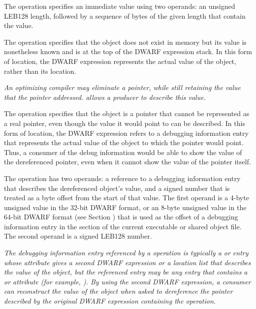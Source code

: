 \begin{enumerate}[1. ]
\itembfnl{\DWOPimplicitvalueTARG}
The \DWOPimplicitvalueNAME{} operation specifies an immediate value
using two operands: an unsigned LEB128
length, followed by a
sequence of bytes of the given length that contain the value.

\itembfnl{\DWOPstackvalueTARG}
The \DWOPstackvalueNAME{} operation specifies that the object does not
exist in memory but its value is nonetheless known and is at the top
of the DWARF expression stack. In this form of location, the DWARF
expression represents the actual value of the object, rather than its
location.

\itembfnl{\DWOPimplicitpointerTARG}
\textit{An optimizing compiler may eliminate a pointer, while
still retaining the value that the pointer addressed.
\DWOPimplicitpointerNAME{} allows a producer to describe this value.}

The \DWOPimplicitpointerNAME{} operation specifies that the object is
a pointer that cannot be represented as a real pointer, even though
the value it would point to can be described. In this form of
location, the DWARF expression refers to a debugging information entry
that represents the actual value of the object to which the pointer
would point. Thus, a consumer of the debug information would be able
to show the value of the dereferenced pointer, even when it cannot
show the value of the pointer itself.

The \DWOPimplicitpointerNAME{} operation has two operands: a
reference to a debugging information entry that describes
the dereferenced object's value, and a signed number that
is treated as a byte offset from the start of that value.
The first operand is a 4-byte unsigned value in the 32-bit
DWARF format, or an 8-byte unsigned value in the 64-bit
DWARF format (see Section
)
\bb
that is used as the offset of a debugging information entry
in the \dotdebuginfo{} section of the current executable
or shared object file.
\eb
The second operand is a
signed LEB128 number.
\db

\textit{The debugging information entry referenced by a
\DWOPimplicitpointerNAME{} operation is typically a
\DWTAGvariable{} or \DWTAGformalparameter{} entry whose
\DWATlocation{} attribute gives a second DWARF expression or a
location list that describes the value of the object, but the
referenced entry may be any entry that contains a \DWATlocation{}
or \DWATconstvalue{} attribute (for example, \DWTAGdwarfprocedure).
By using the second DWARF expression, a consumer can
reconstruct the value of the object when asked to dereference
the pointer described by the original DWARF expression
containing the \DWOPimplicitpointer{} operation.}


\end{enumerate}
